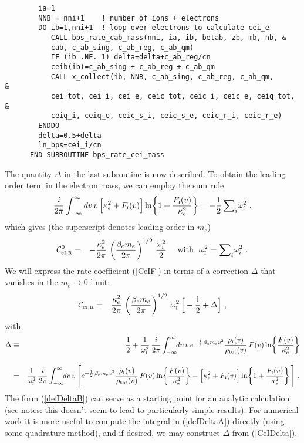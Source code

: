 \documentclass[preprint,12pt,eqsecnum,nofootinbib,amsmath,amssymb]{revtex4}
\newcommand{\smI}{{\rm\scriptscriptstyle I}}
\newcommand{\smR}{{\rm\scriptscriptstyle R}}
\begin{document}
{{{{\begin{verbatim}
        ia=1
        NNB = nni+1    ! number of ions + electrons
        DO ib=1,nni+1  ! loop over electrons to calculate cei_e
           CALL bps_rate_cab_mass(nni, ia, ib, betab, zb, mb, nb, &
           cab, c_ab_sing, c_ab_reg, c_ab_qm)
           IF (ib .NE. 1) delta=delta+c_ab_reg/cn
           ceib(ib)=c_ab_sing + c_ab_reg + c_ab_qm
           CALL x_collect(ib, NNB, c_ab_sing, c_ab_reg, c_ab_qm,      &
           cei_tot, cei_i, cei_e, ceic_tot, ceic_i, ceic_e, ceiq_tot, &
           ceiq_i, ceiq_e, ceic_s_i, ceic_s_e, ceic_r_i, ceic_r_e)
        ENDDO
        delta=0.5+delta
        ln_bps=cei_i/cn
      END SUBROUTINE bps_rate_cei_mass
\end{verbatim}

The quantity $\Delta$ in the last subroutine is now described. To
obtain the leading order term in the electron mass, we can employ the
sum rule
\begin{eqnarray}
  \frac{i}{2 \pi}\int_{-\infty}^{\infty}  dv \, v\, 
  \Big[\kappa_e^2 + F_\smI(v)\Big]
  \ln\! \left\{ 1 + \frac{F_\smI(v)}{\kappa_e^2}\right\} 
  =
  -\frac{1}{2}\,{\sum}_i \omega_i^2 \ ,
\end{eqnarray}
which gives (the superscript denotes leading order in $m_e$)
\begin{eqnarray}
  {\cal C}^0_{e\smI,\smR} 
  &=&
  - \frac{\kappa_e^2}{2\pi} \,
  \left( \frac{\beta_e m_e}{2\pi} \right)^{1/2} \, 
  \frac{\omega_\smI^2}{2} 
  ~~~~\text{with}~~ \omega_\smI^2={\sum}_i \omega_i^2 \ .
\label{CeIsmallme}
\end{eqnarray}
We will express the rate coefficient (\ref{CeIF}) in terms
of a correction $\Delta$ that vanishes in the $m_e \to 0$
limit: 
\begin{eqnarray}
  {\cal C}_{e\smI,\smR} 
  &=&
  \frac{\kappa_e^2}{2\pi} \,
  \left( \frac{\beta_e m_e}{2\pi} \right)^{1/2} \, 
  \omega_\smI^2\,\Big[ -\frac{1}{2} + \Delta \Big] \ ,
\label{CeIDelta}
\end{eqnarray}
with
\begin{eqnarray}
  \Delta
  &\equiv&
  \frac{1}{2} + \frac{1}{\omega_\smI^2}\,
  \frac{i}{2 \pi} \int_{-\infty}^{\infty} \!\! dv \, v\, 
  e^{- \frac{1}{2}\,\beta_e m_e  v^2 }  
  \frac{\rho_\smI(v)}{\rho_\text{tot}(v)}\,
  F(v) \ln\! \left\{ \frac{F(v)}{\kappa_e^2}\right\} 
\label{defDeltaA}
\\[10pt]
  &=&
  \frac{1}{\omega_\smI^2}\,
  \frac{i}{2 \pi} \int_{-\infty}^{\infty} \!\! dv \, v\, 
  \Bigg[
  e^{- \frac{1}{2}\,\beta_e m_e  v^2 }  
  \frac{\rho_\smI(v)}{\rho_\text{tot}(v)}\,
  F(v) \ln\! \left\{ \frac{F(v)}{\kappa_e^2}\right\} 
  -
  \Big[\kappa_e^2 + F_\smI(v)\Big]
  \ln\! \left\{ 1 + \frac{F_\smI(v)}{\kappa_e^2}\right\} 
  \Bigg] \ .
\label{defDeltaB}
\nonumber
\\
\end{eqnarray}
The form (\ref{defDeltaB}) can serve as a starting point for
an analytic calculation (see notes: this doesn't seem to lead to
particularly simple results). For numerical work it is more
useful to compute the integral in (\ref{defDeltaA}) directly
(using some quadrature method), and if desired, we may construct
$\Delta$ from (\ref{CeIDelta}). 

}}}}
\end{document}
